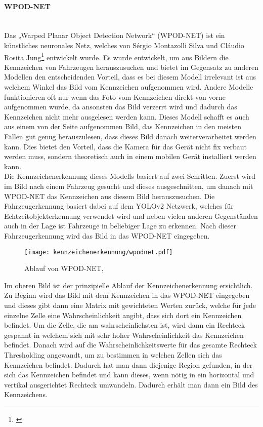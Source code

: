 \paragraph{WPOD-NET}\mbox{}\\
Das „Warped Planar Object Detection Network“ (WPOD-NET) ist ein künstliches neuronales Netz, welches von Sérgio Montazolli Silva und 
Cláudio Rosita Jung\footnote{\cite{wpodnet}}
entwickelt wurde. Es wurde entwickelt, um aus Bildern die Kennzeichen von Fahrzeugen herauszusuchen und bietet im Gegensatz zu anderen Modellen den entscheidenden 
Vorteil, dass es bei diesem Modell irrelevant ist aus welchem Winkel das Bild vom Kennzeichen aufgenommen wird. Andere Modelle funktionieren oft nur wenn das Foto 
vom Kennzeichen direkt von vorne aufgenommen wurde, da ansonsten das Bild verzerrt wird und dadurch das Kennzeichen nicht mehr ausgelesen werden kann. Dieses Modell 
schafft es auch aus einem von der Seite aufgenommen Bild, das Kennzeichen in den meisten Fällen gut genug herauszulesen, dass dieses Bild danach weiterverarbeitet 
werden kann. Dies bietet den Vorteil, dass die Kamera für das Gerät nicht fix verbaut werden muss, sondern theoretisch auch in einem mobilen Gerät installiert werden kann.\\

Die Kennzeichenerkennung dieses Modells basiert auf zwei Schritten. Zuerst wird im Bild nach einem Fahrzeug gesucht und dieses ausgeschnitten, um danach mit 
WPOD-NET das Kennzeichen aus diesem Bild herauszusuchen. Die Fahrzeugerkennung basiert dabei auf dem 
YOLOv2 Netzwerk, 
welches für Echtzeitobjekterkennung verwendet wird und neben vielen anderen Gegenständen auch in der Lage ist Fahrzeuge in beliebiger Lage zu erkennen. Nach dieser Fahrzeugerkennung wird das Bild in das WPOD-NET eingegeben.

\begin{figure}[H]
    \centering
    \texttt{[image: kennzeichenerkennung/wpodnet.pdf]}
    \caption{Ablauf von WPOD-NET, \cite{wpodnet}}
\end{figure}

Im oberen Bild ist der prinzipielle Ablauf der Kennzeichenerkennung ersichtlich. Zu Beginn wird das Bild mit dem Kennzeichen in das WPOD-NET eingegeben 
und dieses gibt dann eine Matrix mit gewichteten Werten zurück, welche für jede einzelne Zelle eine Wahrscheinlichkeit angibt, dass sich dort ein Kennzeichen 
befindet. Um die Zelle, die am wahrscheinlichsten ist, wird dann ein Rechteck gespannt in welchem sich mit sehr hoher Wahrscheinlichkeit das Kennzeichen 
befindet. Danach wird auf die Wahrscheinlichkeitswerte für das gesamte Rechteck Thresholding angewandt, um zu bestimmen in welchen Zellen sich das Kennzeichen 
befindet. Dadurch hat man dann diejenige Region gefunden, in der sich das Kennzeichen befindet und kann dieses, wenn nötig in ein horizontal und vertikal 
ausgerichtet Rechteck umwandeln. Dadurch erhält man dann ein Bild des Kennzeichens.


